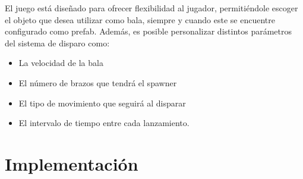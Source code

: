 \documentclass[11pt]{article}
\begin{document}
\vspace{0.5cm} 

El juego está diseñado para ofrecer flexibilidad al jugador, permitiéndole escoger el objeto que desea utilizar como bala, siempre y cuando este se encuentre configurado como prefab. Además, es posible personalizar distintos parámetros del sistema de disparo como:

\begin{itemize}
\item La velocidad de la bala
\item El número de brazos que tendrá el spawner
\item El tipo de movimiento que seguirá al disparar 
\item El intervalo de tiempo entre cada lanzamiento.
\end{itemize}

\section*{Implementación}
\end{document}
